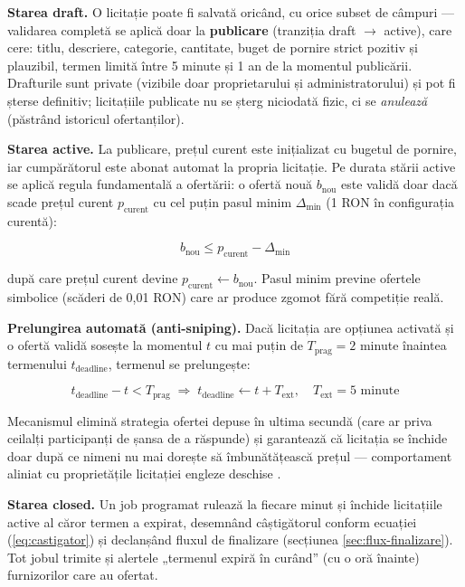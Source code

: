 \textbf{Starea draft.} O licitație poate fi salvată oricând, cu orice subset de câmpuri --- validarea completă se aplică doar la \textbf{publicare} (tranziția draft $\to$ active), care cere: titlu, descriere, categorie, cantitate, buget de pornire strict pozitiv și plauzibil, termen limită între 5 minute și 1 an de la momentul publicării. Drafturile sunt private (vizibile doar proprietarului și administratorului) și pot fi șterse definitiv; licitațiile publicate nu se șterg niciodată fizic, ci se \textit{anulează} (păstrând istoricul ofertanților).

\textbf{Starea active.} La publicare, prețul curent este inițializat cu bugetul de pornire, iar cumpărătorul este abonat automat la propria licitație. Pe durata stării active se aplică regula fundamentală a ofertării: o ofertă nouă $b_{\text{nou}}$ este validă doar dacă scade prețul curent $p_{\text{curent}}$ cu cel puțin pasul minim $\Delta_{\min}$ (1 RON în configurația curentă):

\begin{equation}
\label{eq:regula-oferta}
b_{\text{nou}} \leq p_{\text{curent}} - \Delta_{\min}
\end{equation}

după care prețul curent devine $p_{\text{curent}} \gets b_{\text{nou}}$. Pasul minim previne ofertele simbolice (scăderi de 0,01 RON) care ar produce zgomot fără competiție reală.

\textbf{Prelungirea automată (anti-sniping).} Dacă licitația are opțiunea activată și o ofertă validă sosește la momentul $t$ cu mai puțin de $T_{\text{prag}} = 2$ minute înaintea termenului $t_{\text{deadline}}$, termenul se prelungește:

\begin{equation}
\label{eq:autoextend}
t_{\text{deadline}} - t < T_{\text{prag}} \;\Rightarrow\; t_{\text{deadline}} \gets t + T_{\text{ext}}, \quad T_{\text{ext}} = 5 \text{ minute}
\end{equation}

Mecanismul elimină strategia ofertei depuse în ultima secundă (care ar priva ceilalți participanți de șansa de a răspunde) și garantează că licitația se închide doar după ce nimeni nu mai dorește să îmbunătățească prețul --- comportament aliniat cu proprietățile licitației engleze deschise \cite{mcafee1987}.

\textbf{Starea closed.} Un job programat rulează la fiecare minut și închide licitațiile active al căror termen a expirat, desemnând câștigătorul conform ecuației (\ref{eq:castigator}) și declanșând fluxul de finalizare (secțiunea \ref{sec:flux-finalizare}). Tot jobul trimite și alertele „termenul expiră în curând'' (cu o oră înainte) furnizorilor care au ofertat.

